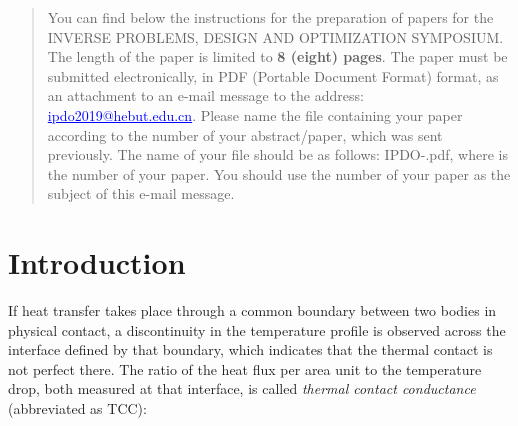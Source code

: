 \documentclass[conference,compsoc]{IEEEtran}
\begin{document}




\maketitle

\begin{abstract}
You can find below the instructions for the preparation of papers for the INVERSE PROBLEMS, DESIGN AND OPTIMIZATION SYMPOSIUM. The length of the paper is limited to \textbf{8 (eight) pages}. The paper must be submitted electronically, in PDF (Portable Document Format) format, as an attachment to an e-mail message to the address:  \textcolor{blue}{\underline {ipdo2019@hebut.edu.cn}}. Please name the file containing your paper according to the number of your abstract/paper, which was sent previously. The name of your file should be as follows: IPDO-.pdf, where  is the number of your paper. You should use the number of your paper as the subject of this e-mail message.

\end{abstract}





%

\IEEEpeerreviewmaketitle


\section{Introduction}

If heat transfer takes place through a common boundary between two bodies in physical contact, a discontinuity in the temperature profile is observed across the interface defined by that boundary, which indicates that the thermal contact is not perfect there. The ratio of the heat flux per area unit to the temperature drop, both measured at that interface, is called \textit{thermal contact conductance} (abbreviated as TCC):
\end{document}

